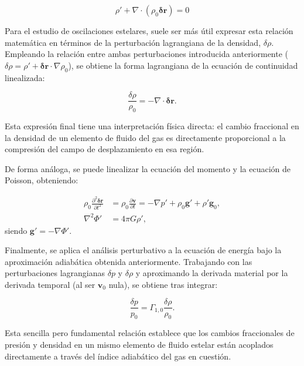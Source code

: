\begin{equation}
  \rho' + \nabla \cdot (\rho_0 \boldsymbol{\delta r}) = 0
  \label{eq:continuidad_linealizada_euleriana}
\end{equation}

Para el estudio de oscilaciones estelares, suele ser más útil expresar esta relación matemática en términos de la perturbación lagrangiana de la densidad, $\delta \rho$. Empleando la relación entre ambas perturbaciones introducida anteriormente ($\delta \rho = \rho' + \boldsymbol{\delta r} \cdot \nabla \rho_0$), se obtiene la forma lagrangiana de la ecuación de continuidad linealizada:

\begin{equation}
  \frac{\delta \rho}{\rho_0} = - \nabla \cdot \boldsymbol{\delta r}.
\end{equation}

Esta expresión final tiene una interpretación física directa: el cambio fraccional en la densidad de un elemento de fluido del gas es directamente proporcional a la compresión del campo de desplazamiento en esa región.

De forma análoga, se puede linealizar la ecuación del momento y la ecuación de Poisson, obteniendo:

\begin{align}
  \rho_0 \frac{\partial^2 \boldsymbol{\delta r}}{\partial t^2} &= \rho_0\frac{\partial \mathbf{v}}{\partial t} = - \nabla p' + \rho_0 \mathbf{g}' + \rho' \mathbf{g}_0, \label{eq:momento_linealizado_euleriana}\\
  \nabla^2 \Phi' &= 4 \pi G \rho',
\end{align}
siendo $\mathbf{g}' = - \nabla \Phi'$.

Finalmente, se aplica el análisis perturbativo a la ecuación de energía bajo la aproximación adiabática obtenida anteriormente. Trabajando con las perturbaciones lagrangianas $\delta p$ y $\delta \rho$ y aproximando la derivada material por la derivada temporal (al ser $\mathbf{v}_0$ nula), se obtiene tras integrar:

\begin{equation*}
  \frac{\delta p}{p_0} = \Gamma_{1,0} \frac{\delta \rho}{\rho_0}.
\end{equation*}

Esta sencilla pero fundamental relación establece que los cambios fraccionales de presión y densidad en un mismo elemento de fluido estelar están acoplados directamente a través del índice adiabático del gas en cuestión.

